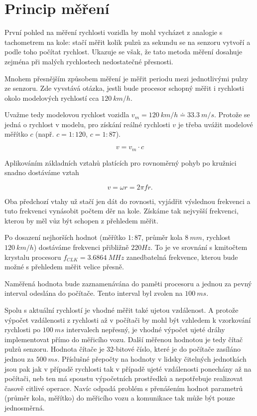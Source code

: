 \section{Princip měření}

První pohled na měření rychlosti vozidla by mohl vycházet z analogie
s tachometrem na kole: stačí měřit kolik pulzů za sekundu se na senzoru vytvoří
a podle toho počítat rychlost. Ukazuje se však, že tato metoda měření dosahuje
zejména při malých rychlostech nedostatečné přesnosti.

Mnohem přesnějším způsobem měření je měřit periodu mezi jednotlivými pulzy ze
senzoru. Zde vyvstává otázka, jestli bude procesor schopný měřit i rychlosti
okolo modelových rychlostí cca $120\ km/h$.

Uvažme tedy modelovou rychlost vozidla $v_m = 120\ km/h \doteq 33.3\ m/s$.
Protože se jedná o rychlost v modelu, pro získání reálné rychlosti $v$ je třeba
uvážit modelové měřítko $c$ (např. $c = 1:120$, $c = 1:87$).

$$v = v_m \cdot c$$

Aplikováním základních vztahů platících pro rovnoměrný pohyb po kružnici snadno
dostáváme vztah

$$v = \omega r = 2 \pi f r.$$

Oba předchozí vtahy už stačí jen dát do rovnosti, vyjádřit výslednou frekvenci
a tuto frekvenci vynásobit počtem děr na kole. Získáme tak nejvyšší frekvenci,
kterou by měl vůz být schopen z přehledem měřit.

Po dosazení nejhorších hodnot (měřítko $1:87$, průměr kola $8\ mm$, rychlost
$120\ km/h$) dostáváme frekvenci přibližně $220 Hz$. To je ve srovnání
s kmitočtem krystalu procesoru $f_{CLK} = 3.6864\ MHz$ zanedbatelná frekvence,
kterou bude možné s přehledem měřit velice přesně.

Naměřená hodnota bude zaznamenávána do paměti procesoru a jednou za pevný
interval odeslána do počítače. Tento interval byl zvolen na $100\ ms$.

Spolu s aktuální rychlostí je vhodné měřit také ujetou vzdálenost. A protože
výpočet vzdálenosti z rychlosti až v počítači by mohl být vzhledem k vzorkování
rychlosti po $100\ ms$ intervalech nepřesný, je vhodné výpočet ujeté dráhy
implementovat přímo do měřicího vozu. Další měřenou hodnotou je tedy čítač
pulzů senzoru. Hodnota čítače je 32-bitové číslo, které je do počítače zasíláno
jednou za $500\ ms$. Příslušné přepočty na hodnoty v lidsky čitelných
jednotkách jsou pak jak v případě rychlosti tak v případě ujeté vzdálenosti
ponechány až na počítači, neb ten má spoustu výpočetních prostředků a
nepotřebuje realizovat časově citlivé operace. Navíc odpadá problém
s přenášením hodnot parametrů (průměr kola, měřítko) do měřicího vozu a
komunikace tak může být pouze jednosměrná.

